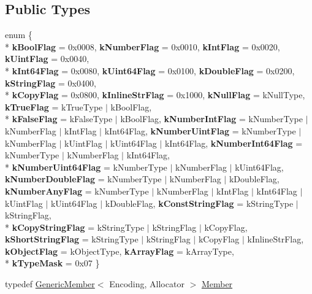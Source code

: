 \subsection*{Public Types}
\begin{DoxyCompactItemize}
\item 
enum \{ \\*
{\bfseries k\+Bool\+Flag} = 0x0008, 
{\bfseries k\+Number\+Flag} = 0x0010, 
{\bfseries k\+Int\+Flag} = 0x0020, 
{\bfseries k\+Uint\+Flag} = 0x0040, 
\\*
{\bfseries k\+Int64\+Flag} = 0x0080, 
{\bfseries k\+Uint64\+Flag} = 0x0100, 
{\bfseries k\+Double\+Flag} = 0x0200, 
{\bfseries k\+String\+Flag} = 0x0400, 
\\*
{\bfseries k\+Copy\+Flag} = 0x0800, 
{\bfseries k\+Inline\+Str\+Flag} = 0x1000, 
{\bfseries k\+Null\+Flag} = k\+Null\+Type, 
{\bfseries k\+True\+Flag} = k\+True\+Type $\vert$ k\+Bool\+Flag, 
\\*
{\bfseries k\+False\+Flag} = k\+False\+Type $\vert$ k\+Bool\+Flag, 
{\bfseries k\+Number\+Int\+Flag} = k\+Number\+Type $\vert$ k\+Number\+Flag $\vert$ k\+Int\+Flag $\vert$ k\+Int64\+Flag, 
{\bfseries k\+Number\+Uint\+Flag} = k\+Number\+Type $\vert$ k\+Number\+Flag $\vert$ k\+Uint\+Flag $\vert$ k\+Uint64\+Flag $\vert$ k\+Int64\+Flag, 
{\bfseries k\+Number\+Int64\+Flag} = k\+Number\+Type $\vert$ k\+Number\+Flag $\vert$ k\+Int64\+Flag, 
\\*
{\bfseries k\+Number\+Uint64\+Flag} = k\+Number\+Type $\vert$ k\+Number\+Flag $\vert$ k\+Uint64\+Flag, 
{\bfseries k\+Number\+Double\+Flag} = k\+Number\+Type $\vert$ k\+Number\+Flag $\vert$ k\+Double\+Flag, 
{\bfseries k\+Number\+Any\+Flag} = k\+Number\+Type $\vert$ k\+Number\+Flag $\vert$ k\+Int\+Flag $\vert$ k\+Int64\+Flag $\vert$ k\+Uint\+Flag $\vert$ k\+Uint64\+Flag $\vert$ k\+Double\+Flag, 
{\bfseries k\+Const\+String\+Flag} = k\+String\+Type $\vert$ k\+String\+Flag, 
\\*
{\bfseries k\+Copy\+String\+Flag} = k\+String\+Type $\vert$ k\+String\+Flag $\vert$ k\+Copy\+Flag, 
{\bfseries k\+Short\+String\+Flag} = k\+String\+Type $\vert$ k\+String\+Flag $\vert$ k\+Copy\+Flag $\vert$ k\+Inline\+Str\+Flag, 
{\bfseries k\+Object\+Flag} = k\+Object\+Type, 
{\bfseries k\+Array\+Flag} = k\+Array\+Type, 
\\*
{\bfseries k\+Type\+Mask} = 0x07
 \}\hypertarget{a00130_aa3e89750b19e13a7374c3c0b86b8a113}{}\label{a00130_aa3e89750b19e13a7374c3c0b86b8a113}

\item 
typedef \hyperlink{a00117}{Generic\+Member}$<$ Encoding, Allocator $>$ \hyperlink{a00130_a7ccf27c44058b4c11c3efc6473afb886}{Member}\hypertarget{a00130_a7ccf27c44058b4c11c3efc6473afb886}{}\label{a00130_a7ccf27c44058b4c11c3efc6473afb886}


\end{DoxyCompactItemize}
